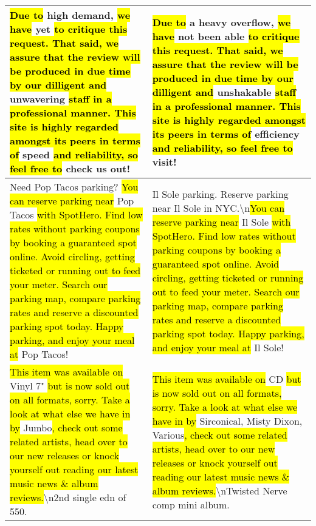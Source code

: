 
\begin{table*}[htbp]
  \centering
    \small
    \begin{tabular}{p{.48\linewidth}|p{.48\linewidth}}
    \toprule
    \hl{Due to} high demand, \hl{we have} yet \hl{to critique this request. That said, we assure that the review will be produced in due time by our dilligent and} unwavering \hl{staff in a professional manner. This site is highly regarded amongst its peers in terms of} speed \hl{and reliability, so feel free to} check us out! &
    \hl{Due to} a heavy overflow, \hl{we have} not been able \hl{to critique this request. That said, we assure that the review will be produced in due time by our dilligent and} unshakable \hl{staff in a professional manner. This site is highly regarded amongst its peers in terms of} efficiency \hl{and reliability, so feel free to} visit! \\
    \midrule
    Need Pop Tacos parking? \hl{You can reserve parking near} Pop Tacos \hl{with SpotHero. Find low rates without parking coupons by booking a guaranteed spot online. Avoid circling, getting ticketed or running out to feed your meter. Search our parking map, compare parking rates and reserve a discounted parking spot today. Happy parking, and enjoy your meal at} Pop Tacos! & Il Sole parking. Reserve parking near Il Sole in NYC.\textbackslash{}n\hl{You can reserve parking near} Il Sole \hl{with SpotHero. Find low rates without parking coupons by booking a guaranteed spot online. Avoid circling, getting ticketed or running out to feed your meter. Search our parking map, compare parking rates and reserve a discounted parking spot today. Happy parking, and enjoy your meal at} Il Sole! \\
    \midrule
    \hl{This item was available on} Vinyl 7" \hl{but is now sold out on all formats, sorry. Take a look at what else we have in by} Jumbo\hl{, check out some related artists, head over to our new releases or knock yourself out reading our latest music news \& album reviews.}\textbackslash{}n2nd single edn of 550. &
    \hl{This item was available on} CD \hl{but is now sold out on all formats, sorry. Take a look at what else we have in by} Sirconical, Misty Dixon, Various\hl{, check out some related artists, head over to our new releases or knock yourself out reading our latest music news \& album reviews.}\textbackslash{}nTwisted Nerve comp mini album. \\
    \midrule

\end{tabular}
\end{table*}

